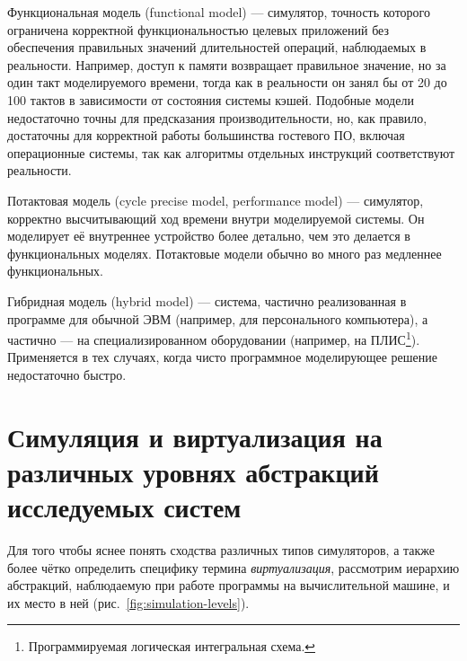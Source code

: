 \begin{description*}
\item[Функциональная модель] (\abbr functional model) --- симулятор, точность которого ограничена корректной функциональностью целевых приложений без обеспечения правильных значений длительностей операций, наблюдаемых в реальности. Например, доступ к памяти возвращает правильное значение, но за один такт моделируемого времени, тогда как в реальности он занял бы от 20 до 100 тактов в зависимости от состояния системы кэшей. Подобные модели недостаточно точны для предсказания производительности, но, как правило, достаточны для корректной работы большинства гостевого ПО, включая операционные системы, так как алгоритмы отдельных инструкций соответствуют реальности.

\item[Потактовая модель] (\abbr cycle precise model, performance model)  --- симулятор, корректно высчитывающий ход времени внутри моделируемой системы. Он моделирует её внутреннее устройство более детально, чем это делается в функциональных моделях. Потактовые модели обычно во много раз медленнее функциональных.

\item[Гибридная модель] (\abbr hybrid model) --- система, частично реализованная в программе для обычной ЭВМ (например, для персонального компьютера), а частично --- на специализированном оборудовании (например, на ПЛИС\footnote{Программируемая логическая интегральная схема.}). Применяется в тех случаях, когда чисто программное моделирующее решение недостаточно быстро.

\end{description*}

\section[Симуляция и виртуализация на различных уровнях]{Симуляция и виртуализация на различных уровнях абстракций исследуемых систем}

Для того чтобы яснее понять сходства различных типов симуляторов, а также более чётко определить специфику термина \emph{виртуализация}, рассмотрим иерархию абстракций, наблюдаемую при работе программы на вычислительной машине, и их место в ней (рис.~\ref{fig:simulation-levels}). 

